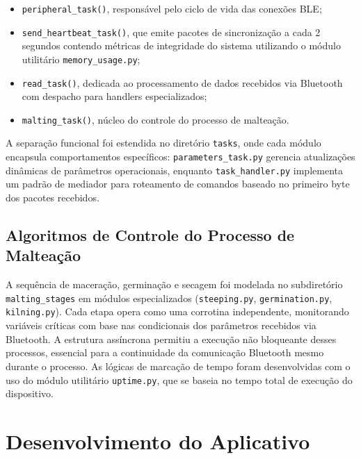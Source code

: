 \begin{itemize}

\item \texttt{peripheral\_task()}, responsável pelo ciclo de vida das conexões BLE;
\item \texttt{send\_heartbeat\_task()}, que emite pacotes de sincronização a cada 2 segundos contendo métricas de integridade do sistema utilizando o módulo utilitário \texttt{memory\_usage.py};
\item \texttt{read\_task()}, dedicada ao processamento de dados recebidos via Bluetooth com despacho para handlers especializados;
\item \texttt{malting\_task()}, núcleo do controle do processo de malteação.

\end{itemize}

A separação funcional foi estendida no diretório \texttt{tasks}, onde cada módulo encapsula comportamentos específicos: \texttt{parameters\_task.py} gerencia atualizações dinâmicas de parâmetros operacionais, enquanto \texttt{task\_handler.py} implementa um padrão de mediador para roteamento de comandos baseado no primeiro byte dos pacotes recebidos.

\subsection{Algoritmos de Controle do Processo de Malteação}
A sequência de maceração, germinação e secagem foi modelada no subdiretório \texttt{malting\_stages} em módulos especializados (\texttt{steeping.py}, \texttt{germination.py}, \texttt{kilning.py}). Cada etapa opera como uma corrotina independente, monitorando variáveis críticas com base nas condicionais dos parâmetros recebidos via Bluetooth. A estrutura assíncrona permitiu a execução não bloqueante desses processos, essencial para a continuidade da comunicação Bluetooth mesmo durante o processo. As lógicas de marcação de tempo foram desenvolvidas com o uso do módulo utilitário \texttt{uptime.py}, que se baseia no tempo total de execução do dispositivo.




\section{Desenvolvimento do Aplicativo}

